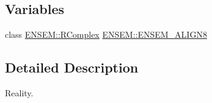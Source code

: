 \subsection*{Variables}
\begin{DoxyCompactItemize}
\item 
class \mbox{\hyperlink{classENSEM_1_1RComplex}{E\+N\+S\+E\+M\+::\+R\+Complex}} \mbox{\hyperlink{group__rcomplex_ga253974755fe5c9f74b16a943e4e26ff5}{E\+N\+S\+E\+M\+::\+E\+N\+S\+E\+M\+\_\+\+A\+L\+I\+G\+N8}}
\end{DoxyCompactItemize}


\subsection{Detailed Description}
Reality. 

